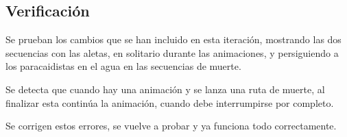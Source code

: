 \subsection{Verificación}
\label{subsec:VerificacionF3I13}

Se prueban los cambios que se han incluido en esta iteración, mostrando las dos secuencias con las aletas, en solitario durante las animaciones, y persiguiendo a los paracaidistas en el agua en las secuencias de muerte. 

Se detecta que cuando hay una animación y se lanza una ruta de muerte, al finalizar esta continúa la animación, cuando debe interrumpirse por completo.

Se corrigen estos errores, se vuelve a probar y ya funciona todo correctamente.

\clearpage